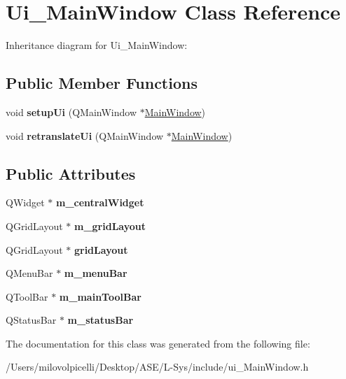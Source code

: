 \hypertarget{class_ui___main_window}{}\section{Ui\+\_\+\+Main\+Window Class Reference}
\label{class_ui___main_window}


Inheritance diagram for Ui\+\_\+\+Main\+Window\+:
\subsection*{Public Member Functions}
\begin{DoxyCompactItemize}
\item 
\mbox{\label{class_ui___main_window_acf4a0872c4c77d8f43a2ec66ed849b58}} 
void {\bfseries setup\+Ui} (Q\+Main\+Window $\ast$\hyperlink{class_main_window}{Main\+Window})
\item 
\mbox{\label{class_ui___main_window_a097dd160c3534a204904cb374412c618}} 
void {\bfseries retranslate\+Ui} (Q\+Main\+Window $\ast$\hyperlink{class_main_window}{Main\+Window})
\end{DoxyCompactItemize}
\subsection*{Public Attributes}
\begin{DoxyCompactItemize}
\item 
\mbox{\label{class_ui___main_window_a454dbd956f5323e9ffcf95c73ea1ce38}} 
Q\+Widget $\ast$ {\bfseries m\+\_\+central\+Widget}
\item 
\mbox{\label{class_ui___main_window_a4deef39c996b45bfb26f412376d33383}} 
Q\+Grid\+Layout $\ast$ {\bfseries m\+\_\+grid\+Layout}
\item 
\mbox{\label{class_ui___main_window_a525ed3c5fe0784ac502ee222fba4e205}} 
Q\+Grid\+Layout $\ast$ {\bfseries grid\+Layout}
\item 
\mbox{\label{class_ui___main_window_ae6a85bc539e41639b00bf948b50d7898}} 
Q\+Menu\+Bar $\ast$ {\bfseries m\+\_\+menu\+Bar}
\item 
\mbox{\label{class_ui___main_window_a304e4a02dabe2cb590e9478ff0e28a3f}} 
Q\+Tool\+Bar $\ast$ {\bfseries m\+\_\+main\+Tool\+Bar}
\item 
\mbox{\label{class_ui___main_window_a4bf40fc3b13f73963ef4cb29310937cb}} 
Q\+Status\+Bar $\ast$ {\bfseries m\+\_\+status\+Bar}
\end{DoxyCompactItemize}


The documentation for this class was generated from the following file\+:\begin{DoxyCompactItemize}
\item 
/\+Users/milovolpicelli/\+Desktop/\+A\+S\+E/\+L-\/\+Sys/include/ui\+\_\+\+Main\+Window.\+h\end{DoxyCompactItemize}
